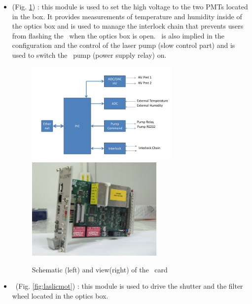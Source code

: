 \begin{itemize}

\item \licpmt (Fig. \ref{fig:laslicpmt}) : this module is used to set the high voltage to the two PMTs located in the box. It provides measurements of temperature and humidity inside of the optics box and is used to manage the interlock chain that prevents users from flashing the \laser~when the optics box is open. \licpmt~is also implied in the configuration and the control of the laser pump (slow control part) and is used to switch the \laser~pump (power supply relay) on. 

\begin{figure}[htbp]
\centering
\includegraphics[height=5cm]{figures/licpmt_scheme.pdf}
\includegraphics[height=5cm]{figures/licpmt.JPG}
\caption{Schematic (left) and view(right) of the \licpmt~card}\label{fig:laslicpmt}
\end{figure}

\item \licmot~(Fig. \ref{fig:laslicmot}) : this module is used to drive the shutter and the filter wheel located in the optics box. 


\end{itemize}
